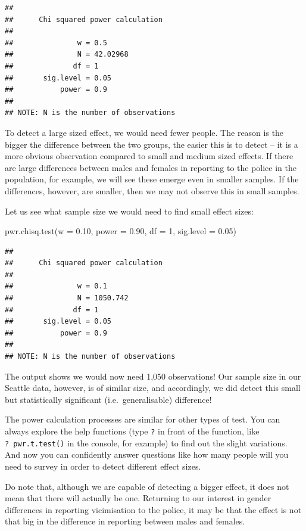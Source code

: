 \documentclass[
]{book}
\newenvironment{Shaded}{\begin{snugshade}}{\end{snugshade}}
\newcommand{\AttributeTok}[1]{\textcolor[rgb]{0.77,0.63,0.00}{#1}}
\newcommand{\DecValTok}[1]{\textcolor[rgb]{0.00,0.00,0.81}{#1}}
\newcommand{\FloatTok}[1]{\textcolor[rgb]{0.00,0.00,0.81}{#1}}
\newcommand{\FunctionTok}[1]{\textcolor[rgb]{0.00,0.00,0.00}{#1}}
\newcommand{\NormalTok}[1]{#1}
\begin{document}
\begin{verbatim}
## 
##      Chi squared power calculation 
## 
##               w = 0.5
##               N = 42.02968
##              df = 1
##       sig.level = 0.05
##           power = 0.9
## 
## NOTE: N is the number of observations
\end{verbatim}

To detect a large sized effect, we would need fewer people. The reason is the bigger the difference between the two groups, the easier this is to detect -- it is a more obvious observation compared to small and medium sized effects. If there are large differences between males and females in reporting to the police in the population, for example, we will see these emerge even in smaller samples. If the differences, however, are smaller, then we may not observe this in small samples.

Let us see what sample size we would need to find small effect sizes:

\begin{Shaded}
\begin{Highlighting}[]
\FunctionTok{pwr.chisq.test}\NormalTok{(}\AttributeTok{w =} \FloatTok{0.10}\NormalTok{, }\AttributeTok{power =} \FloatTok{0.90}\NormalTok{, }\AttributeTok{df =} \DecValTok{1}\NormalTok{, }\AttributeTok{sig.level =} \FloatTok{0.05}\NormalTok{)}
\end{Highlighting}
\end{Shaded}

\begin{verbatim}
## 
##      Chi squared power calculation 
## 
##               w = 0.1
##               N = 1050.742
##              df = 1
##       sig.level = 0.05
##           power = 0.9
## 
## NOTE: N is the number of observations
\end{verbatim}

The output shows we would now need 1,050 observations! Our sample size in our Seattle data, however, is of similar size, and accordingly, we did detect this small but statistically significant (i.e.~generalisable) difference!

The power calculation processes are similar for other types of test. You can always explore the help functions (type \texttt{?} in front of the function, like \texttt{?\ pwr.t.test()} in the console, for example) to find out the slight variations. And now you can confidently answer questions like how many people will you need to survey in order to detect different effect sizes.

Do note that, although we are capable of detecting a bigger effect, it does not mean that there will actually be one. Returning to our interest in gender differences in reporting vicimisation to the police, it may be that the effect is not that big in the difference in reporting between males and females.
\end{document}
